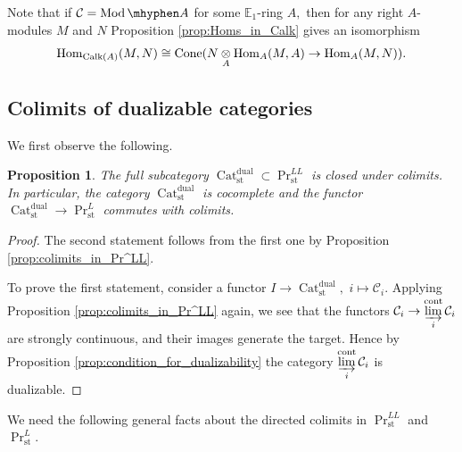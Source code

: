 \documentclass[11pt,leqno]{amsart}
\newtheorem{prop}[theo]{Proposition}
\newtheorem{cor}[theo]{Corollary}
\numberwithin{equation}{section}
\def\Hom{\operatorname{Hom}}
\newcommand{\tens}[1]{%
  \mathbin{\mathop{\otimes}\displaylimits_{#1}}%
}
\newcommand{\hy}{\mhyphen}
\newcommand{\indlim}[1][]{\mathop{\varinjlim}\limits_{#1}}
\newcommand{\xto}{\xrightarrow}
\newcommand{\Cat}{\operatorname{Cat}}
\newcommand{\Cone}{\operatorname{Cone}}
\newcommand{\cont}{\operatorname{cont}}
\newcommand{\st}{\operatorname{st}}
\newcommand{\dual}{\operatorname{dual}}
\newcommand{\bE}{{\mathbb E}}
\newcommand{\cC}{{\mathcal C}}
\newcommand{\Ind}{\operatorname{Ind}}
\newcommand{\Calk}{\operatorname{Calk}}
\newcommand{\Mod}{\operatorname{Mod}}
\begin{document}
Note that if $\cC=\Mod\hy A$ for some $\bE_1$-ring $A,$ then  for any right $A$-modules $M$ and $N$ Proposition \ref{prop:Homs_in_Calk} gives an isomorphism
$$\Hom_{\Calk(A)}(M,N)\cong\Cone(N\tens{A}\Hom_A(M,A)\to\Hom_A(M,N)).$$

\subsection{Colimits of dualizable categories}
\label{ssec:colimits_of_dualizable}

We first observe the following.

\begin{prop}\label{prop:colimits_of_dualizable} The full subcategory $\Cat_{\st}^{\dual}\subset \Pr_{\st}^{LL}$ is closed under colimits. In particular, the category $\Cat_{\st}^{\dual}$ is cocomplete and the functor $\Cat_{\st}^{\dual}\to \Pr_{\st}^{L}$ commutes with colimits.\end{prop}

\begin{proof}The second statement follows from the first one by Proposition \ref{prop:colimits_in_Pr^LL}.

To prove the first statement, consider a functor $I\to\Cat_{\st}^{\dual},$ $i\mapsto\cC_i.$ Applying Proposition \ref{prop:colimits_in_Pr^LL} again, we see that the functors $\cC_i\to \indlim[i]^{\cont}\cC_i$ are strongly continuous, and their images generate the target. Hence by Proposition \ref{prop:condition_for_dualizability} the category $\indlim[i]^{\cont}\cC_i$ is dualizable. 
\end{proof}






We need the following general facts about the directed colimits in $\Pr^{LL}_{\st}$ and $\Pr^L_{\st}.$
\end{document}
